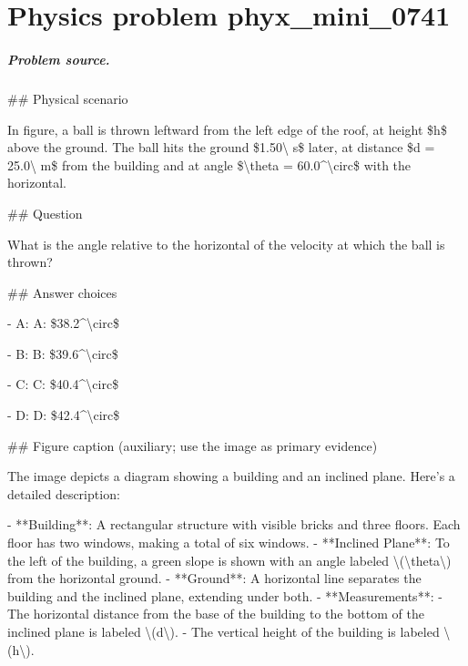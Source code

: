 
\chapter{Physics problem phyx\_mini\_0741}
\label{ch:PhyXMiniProblems_problem_phyx_mini_0741}

\paragraph{Problem source.}
\#\# Physical scenario

In figure, a ball is thrown leftward from the left edge of the roof, at height \$h\$ above the ground. The ball hits the ground \$1.50\textbackslash{} s\$ later, at distance \$d = 25.0\textbackslash{} m\$ from the building and at angle \$\textbackslash{}theta = 60.0\textasciicircum{}\textbackslash{}circ\$ with the horizontal.

\#\# Question

What is the angle relative to the horizontal of the velocity at which the ball is thrown?

\#\# Answer choices

- A: A: \$38.2\textasciicircum{}\textbackslash{}circ\$

- B: B: \$39.6\textasciicircum{}\textbackslash{}circ\$

- C: C: \$40.4\textasciicircum{}\textbackslash{}circ\$

- D: D: \$42.4\textasciicircum{}\textbackslash{}circ\$

\#\# Figure caption (auxiliary; use the image as primary evidence)

The image depicts a diagram showing a building and an inclined plane. Here's a detailed description:

- **Building**: A rectangular structure with visible bricks and three floors. Each floor has two windows, making a total of six windows.
- **Inclined Plane**: To the left of the building, a green slope is shown with an angle labeled \textbackslash{}(\textbackslash{}theta\textbackslash{}) from the horizontal ground.
- **Ground**: A horizontal line separates the building and the inclined plane, extending under both.
- **Measurements**:
  - The horizontal distance from the base of the building to the bottom of the inclined plane is labeled \textbackslash{}(d\textbackslash{}).
  - The vertical height of the building is labeled \textbackslash{}(h\textbackslash{}).

